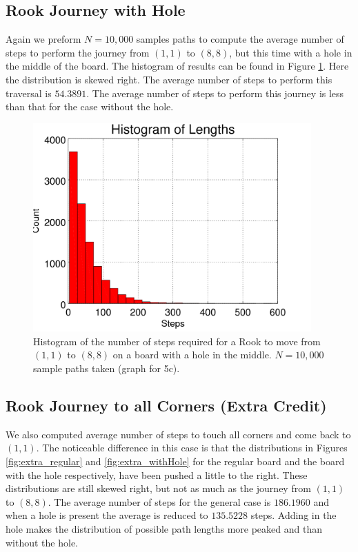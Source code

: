 \documentclass{amsart}
\numberwithin{equation}{section}
\begin{document}
\subsection{Rook Journey with Hole}
Again we preform $N=10,000$ samples paths to compute the average number of steps to perform the journey from $(1,1)$ to $(8,8)$, but this time with a hole in the middle of the board. The histogram of results can be found in Figure \ref{plots:graphs_5c2}. Here the distribution is skewed right. The average number of steps to perform this traversal is $54.3891$. The average number of steps to perform this journey is less than that for the case without the hole.

\begin{figure}
    \centering
    \includegraphics[width=0.95\textwidth]{figures/withHole/figure_Rook_journey_N10000.png}
    \caption{Histogram of the number of steps required for a Rook to move from $(1,1)$ to $(8,8)$ on a board with a hole in the middle. $N=10,000$ sample paths taken (graph for 5c).}
    \label{plots:graphs_5c2}
\end{figure}

\subsection{Rook Journey to all Corners (Extra Credit)}
We also computed average number of steps to touch all corners and come back to $(1,1)$. The noticeable difference in this case is that the distributions in Figures \ref{fig:extra_regular} and \ref{fig:extra_withHole} for the regular board and the board with the hole respectively, have been pushed a little to the right. These distributions are still skewed right, but not as much as the journey from $(1,1)$ to $(8,8)$. The average number of steps for the general case is $186.1960$ and when a hole is present the average is reduced to $135.5228$ steps. Adding in the hole makes the distribution of possible path lengths more peaked and than without the hole.
\end{document}
